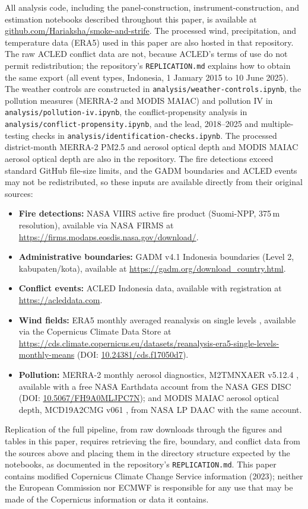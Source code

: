 \documentclass[12pt]{article}
\begin{document}
All analysis code, including the panel-construction, instrument-construction, and estimation notebooks described throughout this paper, is available at \href{https://github.com/Hariaksha/smoke-and-strife}{github.com/Hariaksha/smoke-and-strife}. The processed wind, precipitation, and temperature data (ERA5) used in this paper are also hosted in that repository. The raw ACLED conflict data are not, because ACLED's terms of use do not permit redistribution; the repository's \texttt{REPLICATION.md} explains how to obtain the same export (all event types, Indonesia, 1 January 2015 to 10 June 2025). The weather controls are constructed in \texttt{analysis/weather-controls.ipynb}, the pollution measures (MERRA-2 and MODIS MAIAC) and pollution IV in \texttt{analysis/pollution-iv.ipynb}, the conflict-propensity analysis in \texttt{analysis/conflict-propensity.ipynb}, and the lead, 2018--2025 and multiple-testing checks in \texttt{analysis/identification-checks.ipynb}. The processed district-month MERRA-2 PM2.5 and aerosol optical depth and MODIS MAIAC aerosol optical depth are also in the repository. The fire detections exceed standard GitHub file-size limits, and the GADM boundaries and ACLED events may not be redistributed, so these inputs are available directly from their original sources:
\begin{itemize}
    \item \textbf{Fire detections:} NASA VIIRS active fire product (Suomi-NPP, 375\,m resolution), available via NASA FIRMS at \url{https://firms.modaps.eosdis.nasa.gov/download/}.
    \item \textbf{Administrative boundaries:} GADM v4.1 Indonesia boundaries (Level 2, kabupaten/kota), available at \url{https://gadm.org/download_country.html}.
    \item \textbf{Conflict events:} ACLED Indonesia data, available with registration at \url{https://acleddata.com}.
    \item \textbf{Wind fields:} ERA5 monthly averaged reanalysis on single levels \citep{hersbach2023era5}, available via the Copernicus Climate Data Store at \url{https://cds.climate.copernicus.eu/datasets/reanalysis-era5-single-levels-monthly-means} (DOI: \href{https://doi.org/10.24381/cds.f17050d7}{10.24381/cds.f17050d7}).
    \item \textbf{Pollution:} MERRA-2 monthly aerosol diagnostics, M2TMNXAER v5.12.4 \citep{gelaro2017merra}, available with a free NASA Earthdata account from the NASA GES DISC (DOI: \href{https://doi.org/10.5067/FH9A0MLJPC7N}{10.5067/FH9A0MLJPC7N}); and MODIS MAIAC aerosol optical depth, MCD19A2CMG v061 \citep{lyapustin2018maiac}, from NASA LP DAAC with the same account.
\end{itemize}
Replication of the full pipeline, from raw downloads through the figures and tables in this paper, requires retrieving the fire, boundary, and conflict data from the sources above and placing them in the directory structure expected by the notebooks, as documented in the repository's \texttt{REPLICATION.md}. This paper contains modified Copernicus Climate Change Service information (2023); neither the European Commission nor ECMWF is responsible for any use that may be made of the Copernicus information or data it contains.
\end{document}
